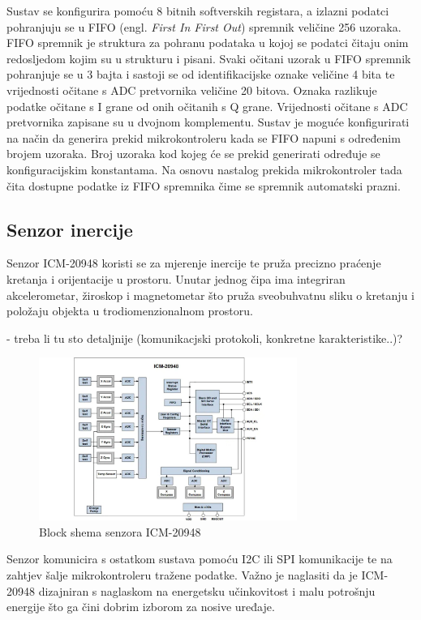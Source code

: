 \documentclass[../diplomski_rad.tex]{subfiles}
\begin{document}
Sustav se konfigurira pomoću 8 bitnih softverskih registara, a izlazni podatci pohranjuju se u 
FIFO (engl. \textit{First In First Out}) spremnik veličine 256 uzoraka.
FIFO spremnik je struktura za pohranu podataka u kojoj se podatci čitaju onim redosljedom kojim su u strukturu i pisani. 
Svaki očitani uzorak u FIFO spremnik pohranjuje se u 3 bajta i sastoji se od identifikacijske oznake veličine 4 bita te vrijednosti očitane s ADC 
pretvornika veličine 20 bitova. 
Oznaka razlikuje podatke očitane s I grane od onih očitanih s Q grane.
Vrijednosti očitane s ADC pretvornika zapisane su u dvojnom komplementu. 
Sustav je moguće konfigurirati na način da generira prekid mikrokontroleru kada se FIFO napuni s određenim brojem uzoraka. 
Broj uzoraka kod kojeg će se prekid generirati određuje se konfiguracijskim konstantama. Na osnovu nastalog prekida 
mikrokontroler tada čita dostupne podatke iz FIFO spremnika čime se spremnik automatski prazni.  

\subsection{Senzor inercije}

Senzor ICM-20948 koristi se za mjerenje inercije te pruža precizno praćenje kretanja i orijentacije u prostoru.
Unutar jednog čipa ima integriran akcelerometar, žiroskop i magnetometar što pruža sveobuhvatnu sliku o kretanju 
i položaju objekta u trodiomenzionalnom prostoru. 

- treba li tu sto detaljnije (komunikacjski protokoli, konkretne karakteristike..)?

\begin{figure}[htb]
    \centering
    \includegraphics[width=0.75\textwidth]{Figures/ICM-20948.jpg} 
    \caption{Block shema senzora ICM-20948 \cite{icm20948}}
    \label{slk:icm20948}
\end{figure}

Senzor komunicira s ostatkom sustava pomoću I2C ili SPI komunikacije te na zahtjev šalje mikrokontroleru tražene podatke.
Važno je naglasiti da je ICM-20948 dizajniran s naglaskom na energetsku učinkovitost i malu potrošnju energije 
što ga čini dobrim izborom za nosive uređaje.
\end{document}
